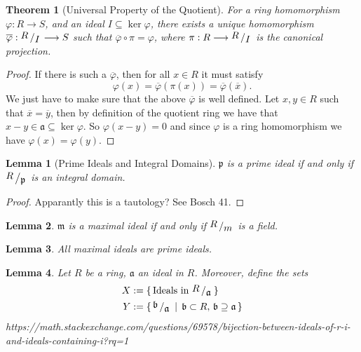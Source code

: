 \documentclass{book}
\theoremstyle{custom_definition}
\theoremstyle{custom_theorem}
\newtheorem{lemma}{Lemma}
\newtheorem{theorem}{Theorem}
\newcommand{\bigslant}[2]{{\raisebox{.2em}{$#1$}\left/\raisebox{-.2em}{$#2$}\right.}}
\begin{document}
    \begin{theorem}[Universal Property of the Quotient]
        For a ring homomorphism \(\varphi: R \longrightarrow S\), and an ideal \(I \subseteq \ker{\varphi}\), there exists a unique homomorphism \(\overline{\varphi}: \bigslant{R}{I} \longrightarrow S\) such that \(\overline{\varphi} \circ \pi = \varphi\), where \(\pi: R \longrightarrow \bigslant{R}{I}\) is the canonical projection.
    \end{theorem}
    \begin{proof}
        If there is such a \(\overline{\varphi}\), then for all \(x \in R\) it must satisfy
        \begin{equation}
            \varphi(x) = \overline{\varphi}(\pi(x)) = \overline{\varphi}(\overline{x}) \text{.}
        \end{equation}
        We just have to make sure that the above \(\overline{\varphi}\) is well defined. Let \(x, y \in R\) such that \(\overline{x} = \overline{y}\), then by definition of the quotient ring we have that \(x - y \in \mathfrak{a} \subseteq \ker \varphi\). So \(\varphi(x - y) = 0\) and since \(\varphi\) is a ring homomorphism we have \(\varphi(x) = \varphi(y)\).
    \end{proof}
    \begin{lemma}[Prime Ideals and Integral Domains]
        \(\mathfrak{p}\) is a prime ideal if and only if \(\bigslant{R}{\mathfrak{p}}\) is an integral domain.
    \end{lemma}
    \begin{proof}
    Apparantly this is a tautology? See Bosch 41.
    \end{proof}
    \begin{lemma}
        \(\mathfrak{m}\) is a maximal ideal if and only if \(\bigslant{R}{m}\) is a field.
    \end{lemma}
    \begin{lemma}
        All maximal ideals are prime ideals.
    \end{lemma}
    \begin{lemma}
        Let \(R\) be a ring, \(\mathfrak{a}\) an ideal in \(R\). Moreover, define the sets
        \begin{align}
            X &:= \{\, \text{Ideals in \(\bigslant{R}{\mathfrak{a}}\)} \,\} \\
            Y &:= \{\, \bigslant{\mathfrak{b}}{\mathfrak{a}} \,\mid\, \mathfrak{b} \subset R, \, \mathfrak{b} \supseteq \mathfrak{a} \,\}
        \end{align}
        https://math.stackexchange.com/questions/69578/bijection-between-ideals-of-r-i-and-ideals-containing-i?rq=1
    \end{lemma}
\end{document}
